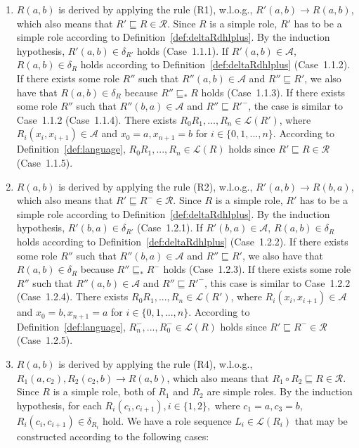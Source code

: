 \begin{enumerate}[leftmargin=12ex,label=Case~1.\arabic*, ref=Case~1.\arabic*]
\item $R(a,b)$ is derived by applying the rule (R1), w.l.o.g., $R'(a,b)\rightarrow R(a,b)$,
    which also means that $R'\sqsubseteq R\in\mathcal{R}$. Since $R$ is a simple role, $R'$ has to
    be a simple role according to Definition~\ref{def:deltaRdhlplus}. By the induction hypothesis,
    $R'(a,b)\in\delta_{R'}$ holds (Case~1.1.1). If $R'(a,b)\in\mathcal{A}$, $R(a,b)\in\delta_{R}$
    holds according to Definition~\ref{def:deltaRdhlplus} (Case~1.1.2). If there exists some
    role $R''$ such that $R''(a,b)\in\mathcal{A}$ and $R''\sqsubseteq R'$, we also have that
    $R(a,b)\in\delta_{R}$ because $R''\sqsubseteq_* R$ holds (Case~1.1.3). If there exists some
    role $R''$ such that $R''(b,a)\in\mathcal{A}$ and $R''\sqsubseteq R'^-$, the case is
    similar to Case~1.1.2 (Case~1.1.4). There exists $R_0R_1,...,R_n\in\mathcal{L}(R')$,
    where $R_i(x_i,x_{i+1})\in\mathcal{A}$ and $x_0=a, x_{n+1}=b$ for $i\in\{0,1,...,n\}$.
    According to Definition~\ref{def:language}, $R_0R_1,...,R_n\in\mathcal{L}(R)$ holds since
    $R'\sqsubseteq R\in\mathcal{R}$ (Case~1.1.5).\label{dhlplus:NTIcaseR1}

\item $R(a,b)$ is derived by applying the rule (R2), w.l.o.g., $R'(a,b)\rightarrow R(b,a)$,
    which also means that $R'\sqsubseteq R^-\in\mathcal{R}$. Since $R$ is a simple role, $R'$ has to
    be a simple role according to Definition~\ref{def:deltaRdhlplus}. By the induction hypothesis,
    $R'(b,a)\in\delta_{R'}$ (Case~1.2.1). If $R'(b,a)\in\mathcal{A}$, $R(a,b)\in\delta_{R}$
    holds according to Definition~\ref{def:deltaRdhlplus} (Case~1.2.2). If there exists some
    role $R''$ such that $R''(b,a)\in\mathcal{A}$ and $R''\sqsubseteq R'$, we also have that
    $R(a,b)\in\delta_{R}$ because $R''\sqsubseteq_* R^-$ holds (Case~1.2.3). If there exists some
    role $R''$ such that $R''(a,b)\in\mathcal{A}$ and $R''\sqsubseteq R'^-$, this case is
    similar to Case~1.2.2 (Case~1.2.4). There exists $R_0R_1,...,R_n\in\mathcal{L}(R')$,
    where $R_i(x_i,x_{i+1})\in\mathcal{A}$ and $x_0=b, x_{n+1}=a$ for $i\in\{0,1,...,n\}$.
    According to Definition~\ref{def:language}, $R_n^-,...,R_0^-\in\mathcal{L}(R)$ holds since
    $R'\sqsubseteq R^-\in\mathcal{R}$ (Case~1.2.5).\label{dhlplus:NTIcaseR2}

\item $R(a,b)$ is derived by applying the rule (R4), w.l.o.g.,
    $R_1(a,c_2),R_2(c_2,b)\rightarrow R(a,b)$,
    which also means that $R_1\circ R_2\sqsubseteq R\in\mathcal{R}$.
    Since $R$ is a simple role, both of $R_1$ and $R_2$ are simple roles. By the induction hypothesis,
    for each $R_i(c_i,c_{i+1}), i\in\{1,2\},$ where $c_1=a, c_3=b$, $R_i(c_i,c_{i+1})\in\delta_{R_i}$
    hold. We have a role sequence $L_i\in\mathcal{L}(R_i)$ that may be
    constructed according to the following cases:


\end{enumerate}
